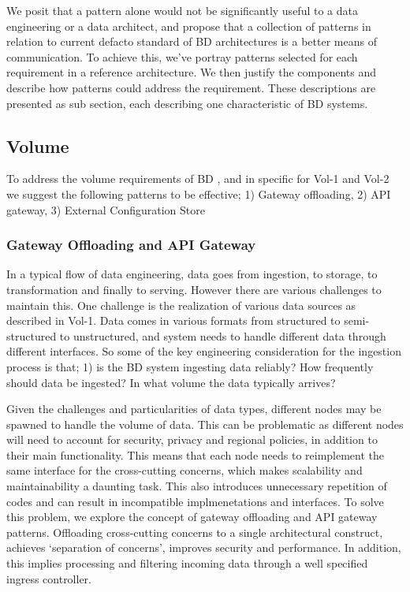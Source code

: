 \documentclass[a4paper,11pt,article,oneside]{memoir}
\begin{document}
We posit that a pattern alone would not be significantly useful to a data engineering or a data architect, and propose that a collection of patterns in relation to current defacto standard of BD architectures is a better means of communication. To achieve this, we've portray patterns selected for each requirement in a reference architecture. We then justify the components and describe how patterns could address the requirement. These descriptions are presented as sub section, each describing one characteristic of BD systems. 


\subsection{Volume} \label{volumeSection}


To address the volume requirements of BD , and in specific for Vol-1 and Vol-2 we suggest the following patterns to be effective; 1) Gateway offloading, 2) API gateway, 3) External Configuration Store

\subsubsection{Gateway Offloading and API Gateway}

In a typical flow of data engineering, data goes from ingestion, to storage, to transformation and finally to serving. However there are various challenges to maintain this. One challenge is the realization of various data sources as described in Vol-1. Data comes in various formats from structured to semi-structured to unstructured, and system needs to handle different data through different interfaces. So some of the key engineering consideration for the ingestion process is that; 1) is the BD system ingesting data reliably? How frequently should data be ingested? In what volume the data typically arrives?

Given the challenges and particularities of data types, different nodes may be spawned to handle the volume of data. This can be problematic as different nodes will need to account for security, privacy and regional policies, in addition to their main functionality. This means that each node needs to reimplement the same interface for the cross-cutting concerns, which makes scalability and maintainability a daunting task. This also introduces unnecessary repetition of codes and can result in incompatible implmenetations and interfaces. To solve this problem, we explore the concept of gateway offloading and API gateway patterns. Offloading cross-cutting concerns to a single architectural construct, achieves `separation of concerns', improves security and performance. In addition, this implies processing and filtering incoming data through a well specified ingress controller.
\end{document}
